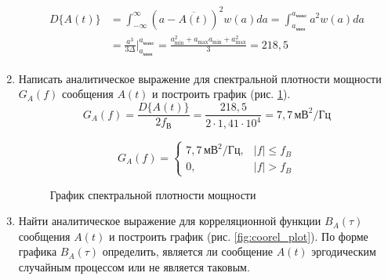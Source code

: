 \documentclass[a4paper, 12pt]{article}
\begin{document}
\begin{enumerate}
  \begin{align}\begin{split}
    D\{A(t)\}&=\int^\infty_{-\infty}(a-\overline{A(t)})^2 w(a)da=
    \int^{a_{макс}}_{a_{мин}}a^2w(a)da\\
    &=\frac{a^3}{3\Delta}\Biggr|^{a_{макс}}_{a_{мин}}\!
    =\frac{a_\text{min}^2+a_\text{max}a_\text{min}+a_\text{max}^2}{3}
    =218,5
  \end{split}\end{align}
  \item Написать аналитическое выражение для спектральной плотности
  мощности $G_A(f)$ сообщения $A(t)$ и построить график 
  (рис. \ref{fig:spectr_plot}).
  \begin{equation}
    G_A(f)=\frac{D\{A(t)\}}{2f_В}=\frac{218,5}{2\cdot1,41\cdot 10^4}
    =7,7 \,мВ^2/Гц 
  \end{equation}

  \begin{equation}
    G_A(f)=\begin{cases}
      7,7 \,мВ^2/Гц, & |f| \leq f_B\\
      0, & |f| > f_B
    \end{cases} 
  \end{equation}

  \begin{figure}[H]
    \centering
    \caption{График спектральной плотности мощности}
    \label{fig:spectr_plot}
  \end{figure}
  \item Найти аналитическое выражение для корреляционной функции
  $B_A(\tau)$ сообщения $A(t)$ и построить график 
  (рис. \ref{fig:coorel_plot}). 
  По форме графика $B_A(\tau)$ определить, 
  является ли сообщение $A(t)$ эргодическим случайным процессом 
  или не является таковым.


\end{enumerate}
\end{document}
